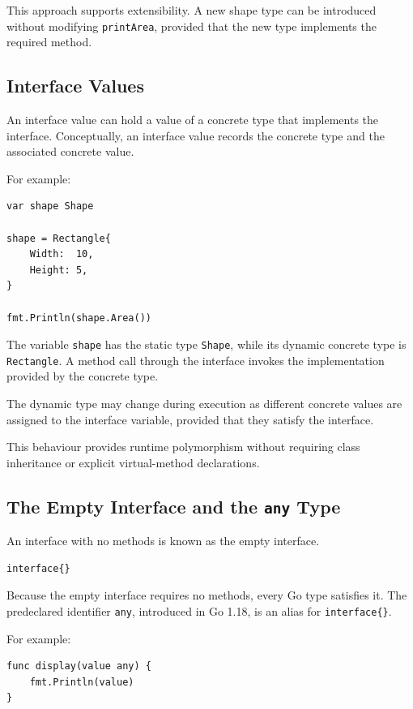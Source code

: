 This approach supports extensibility. A new shape type can be introduced without modifying \texttt{printArea}, provided that the new type implements the required method.

\subsection{Interface Values}

An interface value can hold a value of a concrete type that implements the interface. Conceptually, an interface value records the concrete type and the associated concrete value.

For example:

\begin{lstlisting}
var shape Shape

shape = Rectangle{
    Width:  10,
    Height: 5,
}

fmt.Println(shape.Area())
\end{lstlisting}

The variable \texttt{shape} has the static type \texttt{Shape}, while its dynamic concrete type is \texttt{Rectangle}. A method call through the interface invokes the implementation provided by the concrete type.

The dynamic type may change during execution as different concrete values are assigned to the interface variable, provided that they satisfy the interface.

This behaviour provides runtime polymorphism without requiring class inheritance or explicit virtual-method declarations.

\subsection{The Empty Interface and the \texttt{any} Type}

An interface with no methods is known as the empty interface.

\begin{lstlisting}
interface{}
\end{lstlisting}

Because the empty interface requires no methods, every Go type satisfies it. The predeclared identifier \texttt{any}, introduced in Go 1.18, is an alias for \texttt{interface\{\}}.

For example:

\begin{lstlisting}
func display(value any) {
    fmt.Println(value)
}
\end{lstlisting}


